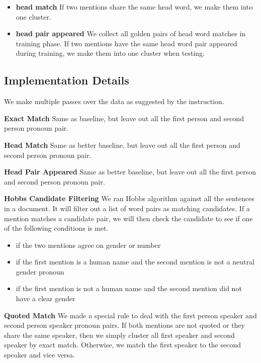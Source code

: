 \documentclass[letterpaper]{article}
\begin{document}
\begin{itemize}
\item \textbf{head match}
If two mentions share the same head word, we make them into one cluster.
\item \textbf{head pair appeared}
We collect all golden pairs of head word matches in training phase.
If two mentions have the same head word pair appeared during training, we make them into one cluster when testing.
\end{itemize}

\subsection{Implementation Details}

We make multiple passes over the data as suggested by the instruction.

\vspace{0.1cm}

\textbf{Exact Match}
Same as baseline, but leave out all the first person and second person pronoun pair.

\vspace{0.1cm}

\textbf{Head Match}
Same as better baseline, but leave out all the first person and second person pronoun pair.

\vspace{0.1cm}

\textbf{Head Pair Appeared}
Same as better baseline, but leave out all the first person and second person pronoun pair.

\vspace{0.1cm}

\textbf{Hobbs Candidate Filtering}
We ran Hobbs algorithm against all the sentences in a document. It will filter out a list of word pairs as matching candidates. If a mention matches a candidate pair, we will then check the candidate to see if one of the following conditions is met.
\begin{itemize}
\item if the two mentions agree on gender or number
\item if the first mention is a human name and the second mention is not a neutral gender pronoun
\item if the first mention is not a human name and the second mention did not have a clear gender
\end{itemize}
\textbf{Quoted Match} We made a special rule to deal with the first person speaker and second person speaker pronoun pairs. If both mentions are not quoted or they share the same speaker, then we simply cluster all first speaker and second speaker by exact match. Otherwise, we match the first speaker to the second speaker and vice versa.
\end{document}
